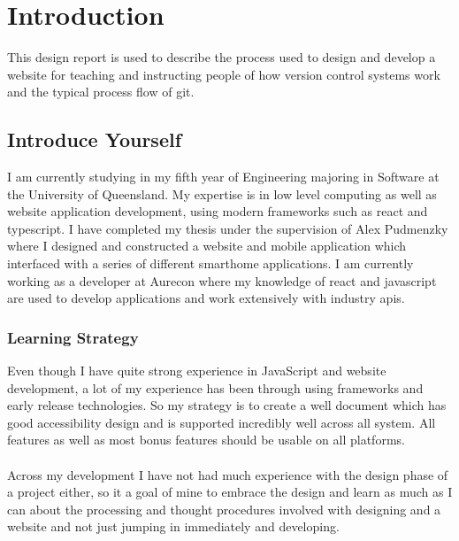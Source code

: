 
\section{Introduction}

This design report is used to describe the process used to design and develop a website for teaching and instructing people of how version control systems work and the typical process flow of git.

\subsection{Introduce Yourself}
I am currently studying in my fifth year of Engineering majoring in Software at the University of Queensland. My expertise is in low level computing as well as website application development, using modern frameworks such as \gls{react} and \gls{typescript}. I have completed my thesis under the supervision of Alex Pudmenzky where I designed and constructed a website and mobile application which interfaced with a series of different \gls{smarthome} applications. I am currently working as a developer at Aurecon where my knowledge of \gls{react} and \gls{javascript} are used to develop applications and work extensively with industry \gls{api}s.

\subsubsection{Learning Strategy}
Even though I have quite strong experience in JavaScript and website development, a lot of my experience has been through using frameworks and early release technologies. So my strategy is to create a well document which has good accessibility design and is supported incredibly well across all system. All features as well as most bonus features should be usable on all platforms.\\\\
Across my development I have not had much experience with the design phase of a project either, so it a goal of mine to embrace the design and learn as much as I can about the processing and thought procedures involved with designing and a website and not just jumping in immediately and developing.